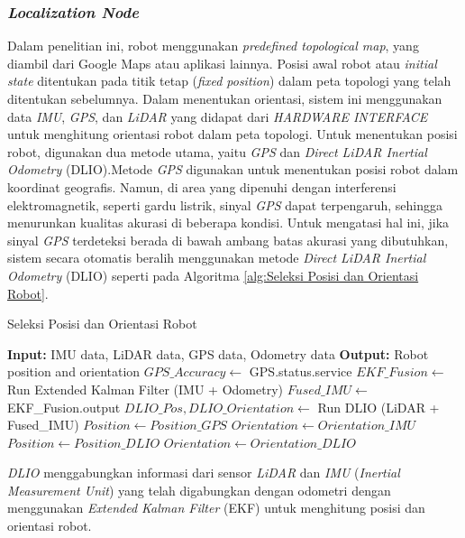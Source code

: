 \subsubsection{\emph{Localization Node}}
Dalam penelitian ini, robot menggunakan \emph{predefined topological map}, yang diambil dari Google Maps atau aplikasi lainnya. Posisi awal robot atau \emph{initial state} ditentukan pada titik tetap (\emph{fixed position}) dalam peta topologi yang telah ditentukan sebelumnya. Dalam menentukan orientasi, sistem ini menggunakan data \emph{IMU}, \emph{GPS}, dan \emph{LiDAR} yang didapat dari \emph{HARDWARE INTERFACE} untuk menghitung orientasi robot dalam peta topologi. Untuk menentukan posisi robot, digunakan dua metode utama, yaitu \emph{GPS} dan \emph{Direct LiDAR Inertial Odometry} (DLIO).Metode \emph{GPS} digunakan untuk menentukan posisi robot dalam koordinat geografis. Namun, di area yang dipenuhi dengan interferensi elektromagnetik, seperti gardu listrik, sinyal \emph{GPS} dapat terpengaruh, sehingga menurunkan kualitas akurasi di beberapa kondisi. Untuk mengatasi hal ini, jika sinyal \emph{GPS} terdeteksi berada di bawah ambang batas akurasi yang dibutuhkan, sistem secara otomatis beralih menggunakan metode \emph{Direct LiDAR Inertial Odometry} (DLIO) seperti pada Algoritma \ref{alg:Seleksi Posisi dan Orientasi Robot}.

\begin{algorithm}
  \caption{Seleksi Posisi dan Orientasi Robot}
  \label{alg:Seleksi Posisi dan Orientasi Robot}
  \begin{algorithmic}[1]
  \State \textbf{Input:} IMU data, LiDAR data, GPS data, Odometry data
  \State \textbf{Output:} Robot position and orientation
  \State $GPS\_Accuracy \gets$ GPS.status.service
  \State $EKF\_Fusion \gets$ Run Extended Kalman Filter (IMU + Odometry)
  \State $Fused\_IMU \gets$ EKF\_Fusion.output
  \State $DLIO\_Pos, DLIO\_Orientation \gets$ Run DLIO (LiDAR + Fused\_IMU)
      \State $Position \gets Position\_GPS$
      \State $Orientation \gets Orientation\_IMU$
  \Else
      \State $Position \gets Position\_DLIO$
      \State $Orientation \gets Orientation\_DLIO$
  \EndIf
  \end{algorithmic}
\end{algorithm}


\emph{DLIO} menggabungkan informasi dari sensor \emph{LiDAR} dan \emph{IMU} (\emph{Inertial Measurement Unit}) yang telah digabungkan dengan odometri dengan menggunakan \emph{Extended Kalman Filter} (EKF) untuk menghitung posisi dan orientasi robot. 


